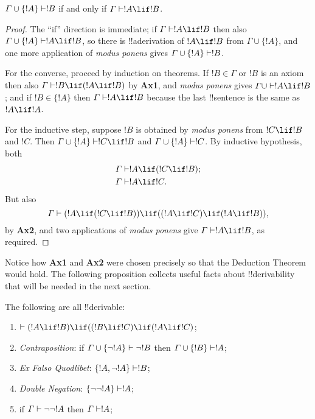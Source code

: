\documentclass[../../include/open-logic-section]{subfiles}
\begin{document}
\begin{thm}
$\Gamma \cup \{!A\} \Proves !B$ if and only if $\Gamma \Proves !A \lif
!B$.
\end{thm}

\begin{proof}
The ``if'' direction is immediate; if $\Gamma \Proves !A \lif !B$ then
also $\Gamma \cup \{!A\}\Proves !A \lif !B$, so there is
!!a{derivation} of $!A\lif !B$ from $\Gamma \cup \{!A\}$, and one more
application of \emph{modus ponens} gives $\Gamma \cup \{!A\} \Proves
!B$.

For the converse, proceed by induction on theorems. If $!B \in \Gamma$
or $!B$ is an axiom then also $\Gamma \Proves !B \lif (!A \lif !B)$ by
\textbf{Ax1}, and \emph{modus ponens} gives $\Gamma\cup \Proves !A
\lif !B$; and if $!B \in \{ !A\}$ then $\Gamma \Proves !A \lif !B$
because the last !!{sentence} is the same as $!A \lif !A$.

For the inductive step, suppose $!B$ is obtained by \emph{modus
  ponens} from $!C \lif !B$ and $!C$. Then $\Gamma \cup \{ !A\}
\Proves !C \lif !B$ and $\Gamma \cup \{ !A\} \Proves !C$. By inductive
hypothesis, both
\begin{align*}
  & \Gamma \Proves !A \lif (!C \lif !B); \\
  & \Gamma \Proves !A \lif !C.
\end{align*}
But also
\[
\Gamma \Proves (!A \lif (!C \lif !B)) \lif
((!A\lif !C)  \lif (!A \lif !B)),
\]
by \textbf{Ax2}, and two applications of \emph{modus ponens} give
$\Gamma \Proves !A \lif !B$, as required.
\end{proof}

Notice how \textbf{Ax1} and \textbf{Ax2} were chosen precisely so that
the Deduction Theorem would hold. The following proposition collects
useful facts about !!{derivability} that will be needed in the next
section.

\begin{prop}
The following are all !!{derivable}:
\begin{enumerate}
\item $\Proves (!A \lif !B) \lif ((!B \lif !C)
  \lif (!A \lif !C)$; 
\item \emph{Contraposition}: if $\Gamma \cup \{ \lnot !A\}
  \Proves \lnot !B$ then $\Gamma \cup \{ !B\} \Proves
  !A$; 
\item \emph{Ex Falso Quodlibet}: $\{ !A, \lnot!A\} \Proves
    !B$; 
\item \emph{Double Negation}: $\{ \lnot\lnot!A\} \Proves
  !A$;
\item if $\Gamma \Proves \lnot\lnot!A$ then $\Gamma \Proves
  !A$;
\end{enumerate}
\end{prop}
\end{document}
